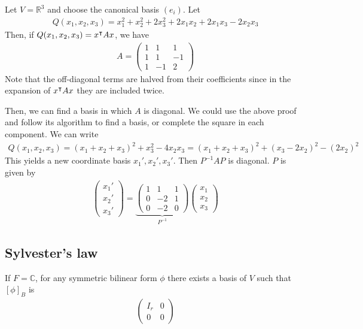 \begin{example}
	Let $V = \mathbb R^3$ and choose the canonical basis $(e_i)$.
	Let
	\begin{align*}
		Q(x_1, x_2, x_3) = x_1^2 + x_2^2 + 2x_3^2 + 2x_1 x_2 + 2x_1 x_3 - 2x_2 x_3
	\end{align*}
	Then, if $Q(x_1, x_2, x_3) = x^\intercal A x$, we have
	\begin{align*}
		A = \begin{pmatrix}
			1 & 1  & 1  \\
			1 & 1  & -1 \\
			1 & -1 & 2
		\end{pmatrix}
	\end{align*}
	Note that the off-diagonal terms are halved from their coefficients since in the expansion of $x^\intercal A x$ they are included twice.

	Then, we can find a basis in which $A$ is diagonal.
	We could use the above proof and follow its algorithm to find a basis, or complete the square in each component.
	We can write
	\begin{align*}
		Q(x_1, x_2, x_3) = (x_1 + x_2 + x_3)^2 + x_3^2 - 4 x_2 x_3 = (x_1 + x_2 + x_3)^2 + (x_3 - 2x_2)^2 - (2x_2)^2
	\end{align*}
	This yields a new coordinate basis $x_1', x_2', x_3'$.
	Then $P^{-1} A P$ is diagonal.
	$P$ is given by
	\begin{align*}
		\begin{pmatrix} x_1' \\ x_2' \\ x_3' \end{pmatrix} = \underbrace{\begin{pmatrix} 1 & 1 & 1 \\ 0 & -2 & 1 \\ 0 & -2 & 0 \end{pmatrix}}_{P^{-1}} \begin{pmatrix} x_1 \\ x_2 \\ x_3 \end{pmatrix}
	\end{align*}
\end{example}

\subsection{Sylvester's law}
\begin{corollary}
	If $F = \mathbb C$, for any symmetric bilinear form $\phi$ there exists a basis of $V$ such that $[\phi]_B$ is
	\begin{align*}
		\begin{pmatrix}
			I_r & 0 \\
			0   & 0
		\end{pmatrix}
	\end{align*}
\end{corollary}

